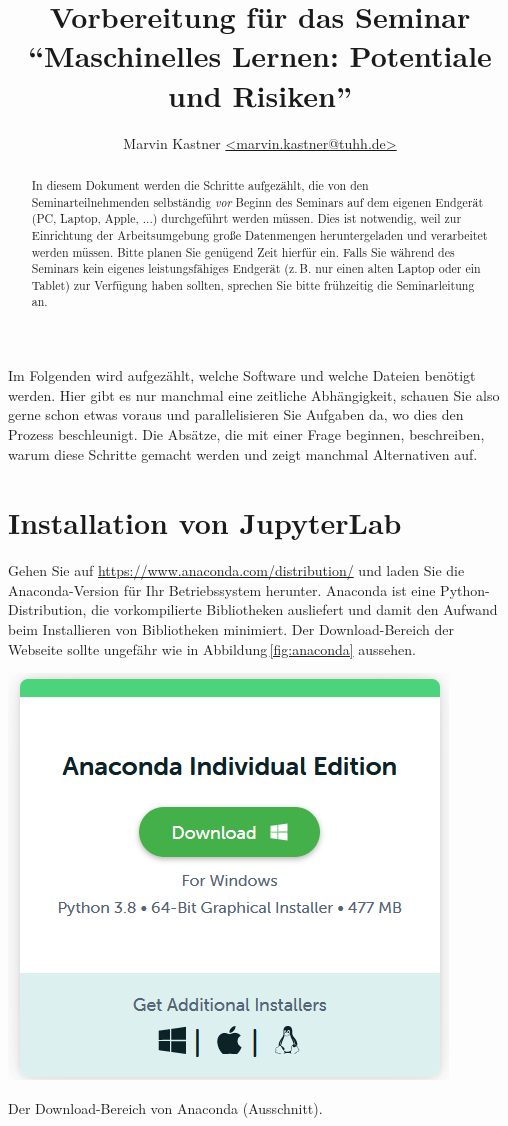 \documentclass{tufte-handout}
\title{Vorbereitung für das Seminar \enquote{Maschinelles Lernen: Potentiale und Risiken}}
\author{Marvin Kastner \href{mailto:marvin.kastner@tuhh.de}{<marvin.kastner@tuhh.de>}}
\begin{document}
\maketitle%

\begin{abstract}
\noindent
In diesem Dokument werden die Schritte aufgezählt, die von den Seminarteilnehmenden selbständig \emph{vor} Beginn des Seminars auf dem eigenen Endgerät (PC, Laptop, Apple, ...) durchgeführt werden müssen.
Dies ist notwendig, weil zur Einrichtung der Arbeitsumgebung große Datenmengen heruntergeladen und verarbeitet werden müssen.
Bitte planen Sie genügend Zeit hierfür ein.
Falls Sie während des Seminars kein eigenes leistungsfähiges Endgerät (z.\,B. nur einen alten Laptop oder ein Tablet) zur Verfügung haben sollten, sprechen Sie bitte frühzeitig die Seminarleitung an.
\end{abstract}

Im Folgenden wird aufgezählt, welche Software und welche Dateien benötigt werden.
Hier gibt es nur manchmal eine zeitliche Abhängigkeit, schauen Sie also gerne schon etwas voraus und parallelisieren Sie Aufgaben da, wo dies den Prozess beschleunigt.
Die Absätze, die mit einer Frage beginnen, beschreiben, warum diese Schritte gemacht werden und zeigt manchmal Alternativen auf.


\section{Installation von JupyterLab}

Gehen Sie auf
\url{https://www.anaconda.com/distribution/} 
und laden Sie die Anaconda-Version für Ihr Betriebssystem herunter.
Anaconda ist eine Python-Distribution, die vorkompilierte Bibliotheken ausliefert und damit den Aufwand beim Installieren von Bibliotheken minimiert.
Der Download-Bereich der Webseite sollte ungefähr wie in Abbildung\,\ref{fig:anaconda} aussehen.

\begin{marginfigure}
  \includegraphics{anaconda}
  \caption{Der Download-Bereich von Anaconda (Ausschnitt).}%
\label{fig:anaconda}
\end{marginfigure}
\end{document}
